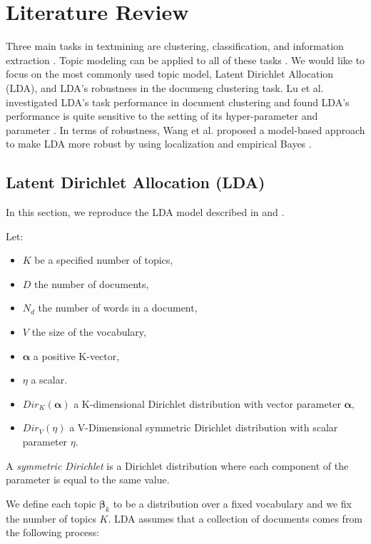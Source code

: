 \documentclass{article}
\begin{document}
\section{Literature Review}

Three main tasks in textmining are clustering, classification, and information extraction \cite{allahyari2017brief}. Topic modeling can be applied to all of these tasks \cite{lu2011investigating}. We would like to focus on the most commonly used topic model, Latent Dirichlet Allocation (LDA), and LDA's robustness in the documeng clustering task. Lu et al. investigated LDA's task performance in document clustering and found LDA's performance is quite sensitive to the setting of its hyper-parameter and parameter \cite{lu2011investigating}. In terms of robustness, Wang et al. proposed a model-based approach to make LDA more robust by using localization and empirical Bayes \cite{wang2018general}.




\subsection{Latent Dirichlet Allocation (LDA)}

In this section, we reproduce the LDA model described in \cite{wang2018general} and \cite{blei2009topic}.

Let:

\begin{itemize}
  \item $K$ be a specified number of topics,
  \item $D$ the number of documents,
  \item $N_d$ the number of words in a document,
  \item $V$  the size of the vocabulary,
  \item $\boldsymbol{\alpha}$ a positive K-vector,
  \item $\eta$ a scalar. 
  \item $Dir_K(\boldsymbol{\alpha})$ a K-dimensional Dirichlet distribution with vector parameter $\boldsymbol{\alpha}$,
  \item $Dir_V(\eta)$ a V-Dimensional symmetric Dirichlet distribution with scalar parameter $\eta$.
\end{itemize}

A \textit{symmetric Dirichlet} is a Dirichlet distribution where each component of the parameter is equal to the same value.

We define each topic $\boldsymbol{\beta}_k$ to be a distribution over a fixed vocabulary and we fix the number of topics $K$. LDA assumes that a collection of documents comes from the following process:
\end{document}
